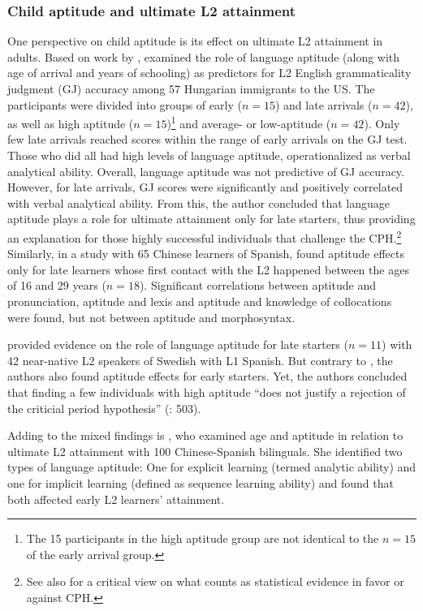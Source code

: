 \documentclass[output=paper]{langscibook}
\begin{document}
\subsubsection{Child aptitude and ultimate L2 attainment}\label{sec:01:2.2.1}  %

One perspective on child aptitude is its effect on ultimate L2 attainment in adults. Based on work by \citet{JohnsonNewport1989}, \citet{DeKeyser2000} examined the role of language aptitude (along with age of arrival and years of schooling) as predictors for L2 English grammaticality judgment (GJ) accuracy among 57 Hungarian immigrants to the US. The participants were divided into groups of early ($n=15$) and late arrivals ($n=42$), as well as high aptitude ($n=15$)\footnote{The 15 participants in the high aptitude group are not identical to the $n=15$ of the early arrival group.} and average- or low-aptitude ($n=42$). Only few late arrivals reached scores within the range of early arrivals on the GJ test. Those who did all had high levels of language aptitude, operationalized as verbal analytical ability. Overall, language aptitude was not predictive of GJ accuracy. However, for late arrivals, GJ scores were significantly and positively correlated with verbal analytical ability. From this, the author concluded that language aptitude plays a role for ultimate attainment only for late starters, thus providing an explanation for those highly successful individuals that challenge the CPH.\footnote{See also \citealt{Vanhove2013} for a critical view on what counts as statistical evidence in favor or against CPH.} Similarly, in a study with 65 Chinese learners of Spanish, \citet{GranenaLong2012} found aptitude effects only for late learners whose first contact with the L2 happened between the ages of 16 and 29 years ($n=18$). Significant correlations between aptitude and pronunciation, aptitude and lexis and aptitude and knowledge of collocations were found, but not between aptitude and morphosyntax. 

\citet{AbrahamssonHyltenstam2008} provided evidence on the role of language aptitude for late starters ($n=11$) with 42 near-native L2 speakers of Swedish with L1 Spanish. But contrary to \citet{DeKeyser2000}, the authors also found aptitude effects for early starters. Yet, the authors concluded that finding a few individuals with high aptitude “does not justify a rejection of the criticial period hypothesis” (\citealt{AbrahamssonHyltenstam2008}: 503).  

Adding to the mixed findings is \citet{Granena2012}, who examined age and aptitude in relation to ultimate L2 attainment with 100 Chinese-Spanish bilinguals. She identified two types of language aptitude: One for explicit learning (termed analytic ability) and one for implicit learning (defined as sequence learning ability) and found that both affected early L2 learners’ attainment. 
\end{document}
